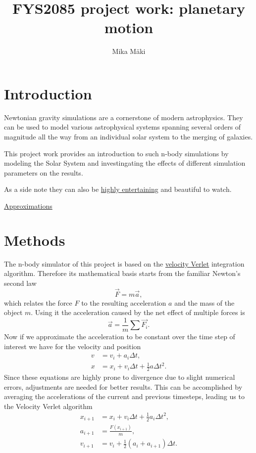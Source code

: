 \documentclass[a4paper]{article}
\title{FYS2085 project work: planetary motion}
\author{Mika Mäki}
\begin{document}
\maketitle
\tableofcontents

\section*{Introduction}
Newtonian gravity simulations are a cornerstone of modern astrophysics.
They can be used to model various astrophysical systems spanning several orders of magnitude all the way from an individual solar system to the merging of galaxies.

This project work provides an introduction to such n-body simulations by modeling the Solar System and investingating the effects of different simulation parameters on the results.

As a side note they can also be
\href{https://www.kerbalspaceprogram.com/}{highly entertaining} and beautiful to watch.

\href{https://beltoforion.de/en/spiral_galaxy_renderer/}{Approximations}


\clearpage
\section{Methods}
The n-body simulator of this project is based on the
\href{https://en.wikipedia.org/wiki/Verlet_integration#Velocity_Verlet}{velocity Verlet} integration algorithm.
Therefore its mathematical basis starts from the familiar Newton's second law
\begin{equation}
\overrightarrow{F} = m \overrightarrow{a},
\end{equation}
which relates the force $F$ to the resulting acceleration $a$ and the mass of the object $m$.
Using it the acceleration caused by the net effect of multiple forces is
\begin{equation}
\overrightarrow{a} = \frac{1}{m} \sum \overrightarrow{F_i}.
\end{equation}
Now if we approximate the acceleration to be constant over the time step of interest we have for the velocity and position
\begin{align}
v &= v_i + a_i \Delta t, \\
x &= x_i + v_i \Delta t + \frac{1}{2} a \Delta t^2.
\end{align}
Since these equations are highly prone to divergence due to slight numerical errors, adjustments are needed for better results.
This can be accomplished by averaging the accelerations of the current and previous timesteps, leading us to the Velocity Verlet algorithm
\begin{align}
x_{i+1} &= x_i + v_i \Delta t + \frac{1}{2} a_i \Delta t^2, \\
a_{i+1} &= \frac{F(x_{i+1})}{m}, \\
v_{i+1} &= v_i + \frac{1}{2}(a_i + a_{i+1}) \Delta t.
\end{align}
\end{document}
